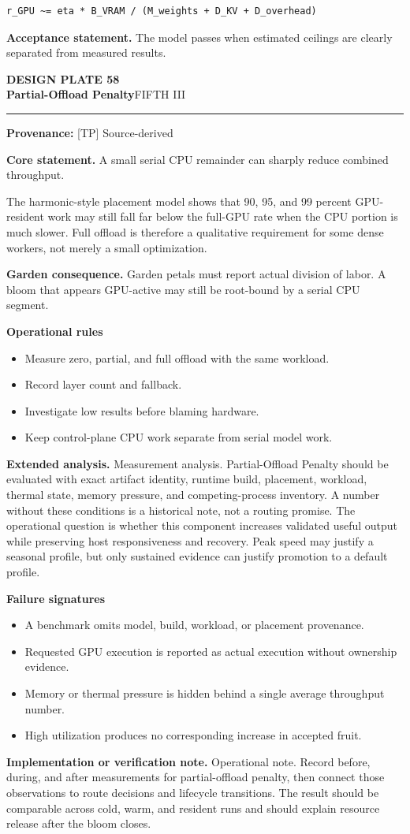 \documentclass[10pt,letterpaper,oneside]{article}
\newcommand{\prov}[1]{\textcolor{gardenBlue}{\sffamily\footnotesize\textbf{Provenance:} #1}}
\newcommand{\platetitle}[3]{%
  \begin{minipage}[t][0.54in][t]{\textwidth}
  {\sffamily\bfseries\color{gardenDeep}\fontsize{9}{10}\selectfont DESIGN PLATE #1}\\[-1pt]
  {\sffamily\bfseries\color{gardenInk}\fontsize{16.5}{18}\selectfont #2}\hfill{\sffamily\color{gardenGreen}\large #3}
  \end{minipage}\vspace{-2pt}\hrule\vspace{5pt}}
\begin{document}
\begin{lstlisting}
r_GPU ~= eta * B_VRAM / (M_weights + D_KV + D_overhead)
\end{lstlisting}
\begin{acceptbox}
\textbf{Acceptance statement.} The model passes when estimated ceilings are clearly separated from measured results.
\end{acceptbox}
\newpage
\platetitle{58}{Partial-Offload Penalty}{FIFTH III}
\prov{[TP] Source-derived}
\fontsize{8.85}{10.45}\selectfont
\begin{corebox}
\textbf{Core statement.} A small serial CPU remainder can sharply reduce combined throughput.
\end{corebox}
The harmonic-style placement model shows that 90, 95, and 99 percent GPU-resident work may still fall far below the full-GPU rate when the CPU portion is much slower. Full offload is therefore a qualitative requirement for some dense workers, not merely a small optimization.

\textbf{Garden consequence.} Garden petals must report actual division of labor. A bloom that appears GPU-active may still be root-bound by a serial CPU segment.

\textbf{Operational rules}
\begin{itemize}
\item Measure zero, partial, and full offload with the same workload.
\item Record layer count and fallback.
\item Investigate low results before blaming hardware.
\item Keep control-plane CPU work separate from serial model work.
\end{itemize}
\textbf{Extended analysis.} Measurement analysis. Partial-Offload Penalty should be evaluated with exact artifact identity, runtime build, placement, workload, thermal state, memory pressure, and competing-process inventory. A number without these conditions is a historical note, not a routing promise. The operational question is whether this component increases validated useful output while preserving host responsiveness and recovery. Peak speed may justify a seasonal profile, but only sustained evidence can justify promotion to a default profile.

\textbf{Failure signatures}
\begin{itemize}
\item A benchmark omits model, build, workload, or placement provenance.
\item Requested GPU execution is reported as actual execution without ownership evidence.
\item Memory or thermal pressure is hidden behind a single average throughput number.
\item High utilization produces no corresponding increase in accepted fruit.
\end{itemize}
\textbf{Implementation or verification note.} Operational note. Record before, during, and after measurements for partial-offload penalty, then connect those observations to route decisions and lifecycle transitions. The result should be comparable across cold, warm, and resident runs and should explain resource release after the bloom closes.
\end{document}
